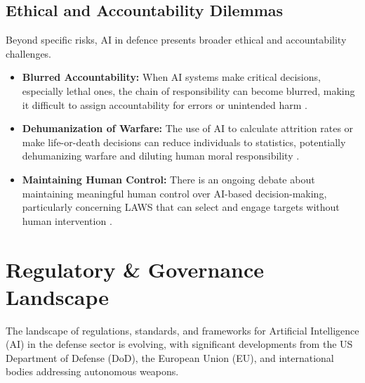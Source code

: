 \subsection{Ethical and Accountability Dilemmas}
Beyond specific risks, AI in defence presents broader ethical and accountability challenges.
\begin{itemize}
    \item \textbf{Blurred Accountability:} When AI systems make critical decisions, especially lethal ones, the chain of responsibility can become blurred, making it difficult to assign accountability for errors or unintended harm \cite{Oxford_Accountability}.
    \item \textbf{Dehumanization of Warfare:} The use of AI to calculate attrition rates or make life-or-death decisions can reduce individuals to statistics, potentially dehumanizing warfare and diluting human moral responsibility \cite{Brookings_Dehumanization}.
    \item \textbf{Maintaining Human Control:} There is an ongoing debate about maintaining meaningful human control over AI-based decision-making, particularly concerning LAWS that can select and engage targets without human intervention \cite{WestPoint_HumanControl}.
\end{itemize}

\section{Regulatory \& Governance Landscape}

The landscape of regulations, standards, and frameworks for Artificial Intelligence (AI) in the defense sector is evolving, with significant developments from the US Department of Defense (DoD), the European Union (EU), and international bodies addressing autonomous weapons.

